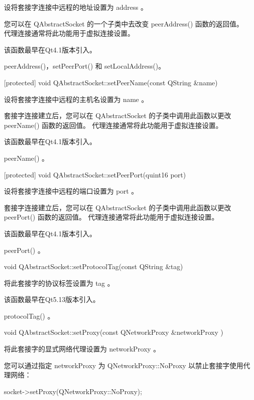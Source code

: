 设将套接字连接中远程的地址设置为 address 。

您可以在 QAbstractSocket 的一个子类中去改变 peerAddress() 函数的返回值。 代理连接通常将此功能用于虚拟连接设置。

该函数最早在Qt4.1版本引入。

\begin{seeAlso}
peerAddress()，setPeerPort() 和 setLocalAddress()。
\end{seeAlso}

[protected] void QAbstractSocket::setPeerName(const QString \&name)

设将套接字连接中远程的主机名设置为 name 。

套接字连接建立后，您可以在 QAbstractSocket 的子类中调用此函数以更改 peerName() 函数的返回值。 代理连接通常将此功能用于虚拟连接设置。

该函数最早在Qt4.1版本引入。


\begin{seeAlso}
 peerName() 。
\end{seeAlso}

[protected] void QAbstractSocket::setPeerPort(quint16 port)

设将套接字连接中远程的端口设置为 port 。

套接字连接建立后，您可以在 QAbstractSocket 的子类中调用此函数以更改 peerPort() 函数的返回值。 代理连接通常将此功能用于虚拟连接设置。

该函数最早在Qt4.1版本引入。


\begin{seeAlso}
peerPort() 。
\end{seeAlso}

void QAbstractSocket::setProtocolTag(const QString \&tag)

将此套接字的协议标签设置为 tag 。

该函数最早在Qt5.13版本引入。


\begin{seeAlso}
protocolTag() 。
\end{seeAlso}

void QAbstractSocket::setProxy(const QNetworkProxy \&networkProxy )

将此套接字的显式网络代理设置为 networkProxy 。

您可以通过指定 networkProxy 为 QNetworkProxy::NoProxy 以禁止套接字使用代理网络：


\begin{cppcode}
socket->setProxy(QNetworkProxy::NoProxy);
\end{cppcode}


